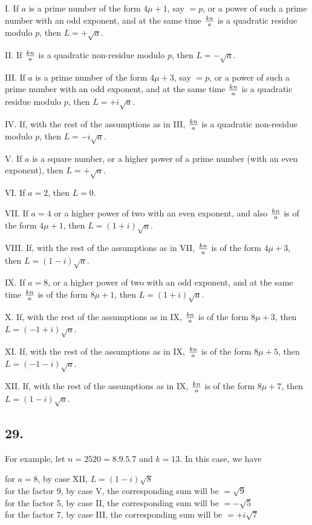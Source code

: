 \documentclass[twoside,12pt]{memoir}
\renewenvironment{quote}%
  {\list{}{\leftmargin=5em\rightmargin=0em}\item[]}%
  {\endlist}
\let\oldfrac\frac
\def\frac#1#2{\mathchoice{\tfrac{#1}{#2}}{\oldfrac{#1}{#2}}{\genfrac{}{}{}{2}{#1}{#2\mathstrut}}{\genfrac{}{}{}{3}{#1}{#2\mathstrut}}}
\begin{document}
I. If \(a\) is a prime number of the form \(4 \mu+1\), say \(=p\), or a power of such a prime number with an odd exponent, and at the same time \(\frac{k n}{a}\) is a quadratic residue modulo \(p\), then \(L=+\sqrt{a}\).

II. If \(\frac{k n}{a}\) is a quadratic non-residue modulo \(p\), then \(L=-\sqrt{a}\).

III. If \(a\) is a prime number of the form \(4 \mu+3\), say \(=p\), or a power of such a prime number with an odd exponent, and at the same time \(\frac{k n}{a}\) is a quadratic residue modulo \(p\), then \(L=+i \sqrt{a}\).

IV. If, with the rest of the assumptions as in III, \(\frac{k n}{a}\) is a quadratic non-residue modulo \(p\), then \(L=-i \sqrt{a}\).

V. If \(a\) is a square number, or a higher power of a prime number (with an even exponent), then \(L=+\sqrt{a}\).

VI. If \(a=2\), then \(L=0\).

VII. If \(a=4\) or a higher power of two with an even exponent, and also \(\frac{k n}{a}\) is of the form \(4 \mu+1\), then \(L=(1+i) \sqrt{a}\).

VIII. If, with the rest of the assumptions as in VII, \(\frac{k n}{a}\) is of the form \(4 \mu+3\), then \(L=(1-i) \sqrt{a}\).

IX. If \(a=8\), or a higher power of two with an odd exponent, and at the same time \(\frac{k n}{a}\) is of the form \(8 \mu+1\), then \(L=(1+i) \sqrt{a}\).

X. If, with the rest of the assumptions as in IX, \(\frac{k n}{a}\) is of the form \(8 \mu+3\), then \(L=(-1+i) \sqrt{a}\).

XI. If, with the rest of the assumptions as in IX, \(\frac{k n}{a}\) is of the form \(8 \mu+5\), then \(L=(-1-i) \sqrt{a}\).

XII. If, with the rest of the assumptions as in IX, \(\frac{k n}{a}\) is of the form \(8 \mu+7\), then \(L=(1-i) \sqrt{a}\).
%

\subsection*{29.}

For example, let \(n=2520=8 . 9 . 5 . 7\) and \(k=13\). In this case, we have
\begin{quote}
for \(a=8\), by case XII, \(L=(1-i) \sqrt{8}\)\\
for the factor 9, by case V, the corresponding sum will be \(=\sqrt{9}\)\\
for the factor 5, by case II, the corresponding sum will be \(=-\sqrt{5}\)\\
for the factor 7, by case III, the corresponding sum will be \(=+i \sqrt{7}\)
\end{quote}
\end{document}
